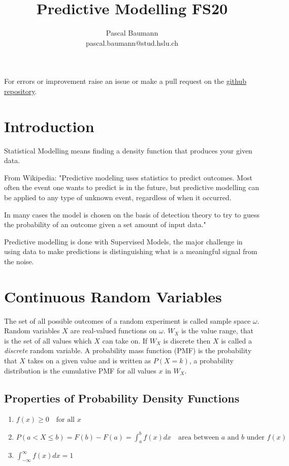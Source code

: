 \documentclass[11pt]{article}
\theoremstyle{definition}
\begin{document}
	
\title{Predictive Modelling FS20}
\author{Pascal Baumann\\pascal.baumann@stud.hslu.ch}
\maketitle



For errors or improvement raise an issue or make a pull request on the \href{https://github.com/KilnOfTheSecondFlame/mse_summaries}{github repository}.

\tableofcontents
\newpage



\section{Introduction}
Statistical Modelling means finding a density function that produces your given data.

From Wikipedia: "Predictive modeling uses statistics to predict outcomes. Most often the event one wants to predict is in the future, but predictive modelling can be applied to any type of unknown event, regardless of when it occurred.

In many cases the model is chosen on the basis of detection theory to try to guess the probability of an outcome given a set amount of input data."

Predictive modelling is done with Supervised Models, the major challenge in using data to make predictions is distinguishing what is a meaningful signal from the noise.

\section{Continuous Random Variables}
The set of all possible outcomes of a random experiment is called sample space $\omega$. Random variables $X$ are real-valued functions on $\omega$. $W_X$ is the value range, that is the set of all values which $X$ can take on. If $W_X$ is discrete then $X$ is called a \emph{discrete} random variable. A probability mass function (PMF) is the probability that $X$ takes on a given value and is written as $P(X=k)$, a probability distribution is the cumulative PMF for all values $x$ in $W_X$.

\subsection{Properties of Probability Density Functions}
\begin{enumerate}
	\item $f(x) \geq 0\quad \text{for all }x$
	\item $P(a<X\leq b) = F(b) - F(a) = \int_{a}^{b}f(x) dx\quad \text{area between }a \text{ and }b \text{ under }f(x)$
	\item $ \int_{-\infty}^{\infty}f(x) dx = 1$
\end{enumerate}
\end{document}
